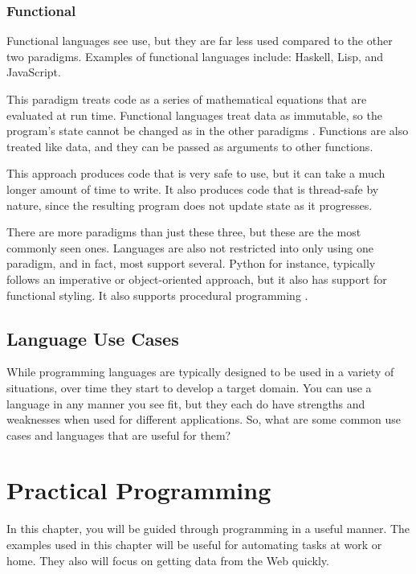 \documentclass[12pt, oneside, a4paper]{book}
\begin{document}
      \subsection{Functional}
      Functional languages see use, but they are far less used compared to the other two paradigms.
      Examples of functional languages include: Haskell, Lisp, and JavaScript\footnotemark.

      This paradigm treats code as a series of mathematical equations that are evaluated at run time.
      Functional languages treat data as immutable, so the program's state cannot be changed as in the other paradigms \autocite{normarkOverviewFourMain}.
      Functions are also treated like data, and they can be passed as arguments to other functions.

      This approach produces code that is very safe to use, but it can take a much longer amount of time to write.
      It also produces code that is thread-safe by nature, since the resulting program does not update state as it progresses.


      There are more paradigms than just these three, but these are the most commonly seen ones.
      Languages are also not restricted into only using one paradigm, and in fact, most support several.
      Python for instance, typically follows an imperative or object-oriented approach, but it also has support for functional styling.
      It also supports procedural programming \autocite{GeneralPythonFAQ}.

      \section{Language Use Cases}
         While programming languages are typically designed to be used in a variety of situations, over time they start to develop a target domain.
         You can use a language in any manner you see fit, but they each do have strengths and weaknesses when used for different applications.
         So, what are some common use cases and languages that are useful for them?

   \chapter{Practical Programming}
   \label{chap:practical}
      In this chapter, you will be guided through programming in a useful manner.
      The examples used in this chapter will be useful for automating tasks at work or home.
      They also will focus on getting data from the Web quickly.
\end{document}
